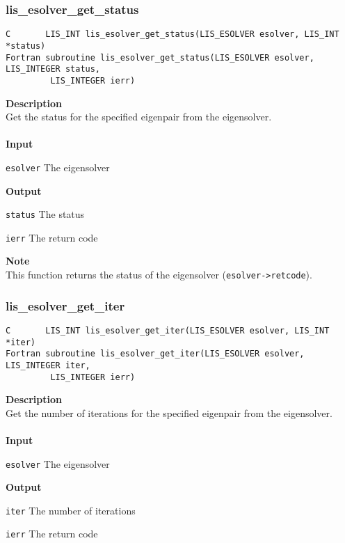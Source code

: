 \documentclass[a4paper]{article}
\newcommand{\namelistlabel}[1]{\mbox{#1}\hfill}
\newenvironment{namelist}[1]{%
\begin{list}{}
  {\let\makelabel\namelistlabel
  \settowidth{\labelwidth}{#1}
  \setlength{\leftmargin}{1.1\labelwidth}}
  }{%
\end{list}}
\begin{document}
\subsubsection{lis\_esolver\_get\_status}
\begin{screen}
\verb|C       LIS_INT lis_esolver_get_status(LIS_ESOLVER esolver, LIS_INT *status)|\\
\verb|Fortran subroutine lis_esolver_get_status(LIS_ESOLVER esolver, LIS_INTEGER status,|\\
\verb|         LIS_INTEGER ierr)|
\end{screen}
{\bf Description}\\
\indent
Get the status for the specified eigenpair from the eigensolver.
\\ \\
\noindent
{\bf Input}
\begin{namelist}{XXXXXXXXXXXXXXXXXXXX}
\item[\tt esolver] The eigensolver
\end{namelist}
{\bf Output}
\begin{namelist}{XXXXXXXXXXXXXXXXXXXX}
\item[\tt status] The status
\item[\tt ierr] The return code
\end{namelist}
{\bf Note}\\
\indent
This function returns the status of the eigensolver ({\tt esolver->retcode}).

\subsubsection{lis\_esolver\_get\_iter}
\begin{screen}
\verb|C       LIS_INT lis_esolver_get_iter(LIS_ESOLVER esolver, LIS_INT *iter)|\\
\verb|Fortran subroutine lis_esolver_get_iter(LIS_ESOLVER esolver, LIS_INTEGER iter,|\\
\verb|         LIS_INTEGER ierr)|
\end{screen}
{\bf Description}\\
\indent
Get the number of iterations for the specified eigenpair from the eigensolver.
\\ \\
\noindent
{\bf Input}
\begin{namelist}{XXXXXXXXXXXXXXXXXXXX}
\item[\tt esolver] The eigensolver
\end{namelist}
{\bf Output}
\begin{namelist}{XXXXXXXXXXXXXXXXXXXX}
\item[\tt iter] The number of iterations
\item[\tt ierr] The return code
\end{namelist}
\end{document}
